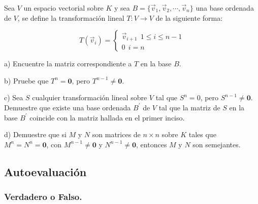 \begin{exercise}
\item
Sea $V$ un espacio vectorial sobre $K$ y sea $B=\{\vec{v}_1,\vec{v}_2,\cdots,\vec{v}_n\}$ una base ordenada de $V$, se define la transformación lineal
$T: V \rightarrow V$ de la siguiente forma:

\[T(\vec{v}_i)=
\left\{
\begin{array}{ll}
\vec{v}_{i+1}~~1 \leq i \leq n-1\\
0~~  i=n
\end{array}
\right.
\]



a) Encuentre la matriz correspondiente a $T$ en la base $B$.

b)
Pruebe que $T^n=\textbf{0}$, pero $T^{n-1} \neq \textbf{0}$.


c)
Sea $S$ cualquier transformación  lineal sobre $V$ tal que $S^n=0$, pero $S^{n-1} \neq \textbf{0}$.
Demuestre que existe una base ordenada $B^{\prime}$ de $V$ tal que la matriz  de $S$ en la base $B^{\prime}$ coincide con la matriz hallada en el primer inciso.

d)
Demuestre que si $M$ y $N$ son matrices de $n \times n$ sobre $K$ tales que $M^n=N^n=\textbf{0}$,  con $M^{n-1} \neq \textbf{0}$ y 
$N^{n-1} \neq \textbf{0}$, entonces $M$ y $N$ son semejantes.
\end{exercise}


\subsection{Autoevaluación}
\label{Auto2}
\bigskip

\subsubsection{Verdadero o Falso.}


 \bigskip

